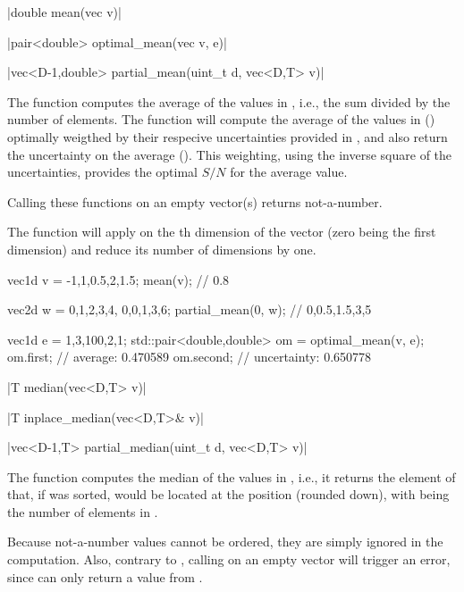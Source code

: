 \funcitem \cppinline|double mean(vec v)| 

\cppinline|pair<double> optimal_mean(vec v, e)| 

\cppinline|vec<D-1,double> partial_mean(uint_t d, vec<D,T> v)| 

The function  computes the average of the values in , i.e., the sum divided by the number of elements. The function  will compute the average of the values in  () optimally weigthed by their respecive uncertainties provided in , and also return the uncertainty on the average (). This weighting, using the inverse square of the uncertainties, provides the optimal $S/N$ for the average value.

Calling these functions on an empty vector(s) returns not-a-number.

The function  will apply  on the th dimension of the vector (zero being the first dimension) and reduce its number of dimensions by one.

\begin{example}
\begin{cppcode}
vec1d v = {-1,1,0.5,2,1.5};
mean(v); // 0.8

vec2d w = {{0,1,2,3,4}, {0,0,1,3,6}};
partial_mean(0, w); // {0,0.5,1.5,3,5}

vec1d e = {1,3,100,2,1};
std::pair<double,double> om = optimal_mean(v, e);
om.first;  // average:     0.470589
om.second; // uncertainty: 0.650778
\end{cppcode}
\end{example}

\funcitem \cppinline|T median(vec<D,T> v)| 

\cppinline|T inplace_median(vec<D,T>& v)| 

\cppinline|vec<D-1,T> partial_median(uint_t d, vec<D,T> v)| 

The function  computes the median of the values in , i.e., it returns the element of  that, if  was sorted, would be located at the position  (rounded down), with  being the number of elements in .

Because not-a-number values cannot be ordered, they are simply ignored in the computation. Also,
contrary to , calling  on an empty vector will trigger an error, since  can only return a value from .

